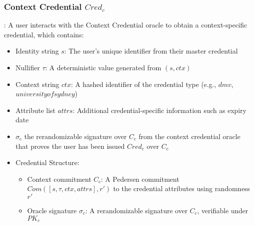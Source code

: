 {\subsubsection{Context Credential $Cred_c$}: 
A user interacts with the Context Credential oracle to obtain a context-specific credential, which contains:
\begin{itemize}
    \item Identity string $s$: The user's unique identifier from their master credential
    \item Nullifier $\tau$: A deterministic value generated from $(s, ctx)$
    \item Context string $ctx$: A hashed identifier of the credential type (e.g., $dmv$, $universityofsydney$)
    \item Attribute list $attrs$: Additional credential-specific information such as expiry date
    \item $\sigma_c$ the rerandomizable signature over $C_c$ from the context credential oracle that proves the user has been issued $Cred_c$ over $C_c$
    \item Credential Structure:
    \begin{itemize}
        \item Context commitment $C_c$: A Pedersen commitment $Com([s, \tau, ctx, attrs],r')$ to the credential attributes using randomness $r'$
        \item Oracle signature $\sigma_c$: A rerandomizable signature over $C_c$, verifiable under $PK_c$
    \end{itemize}
    
\end{itemize}


}
